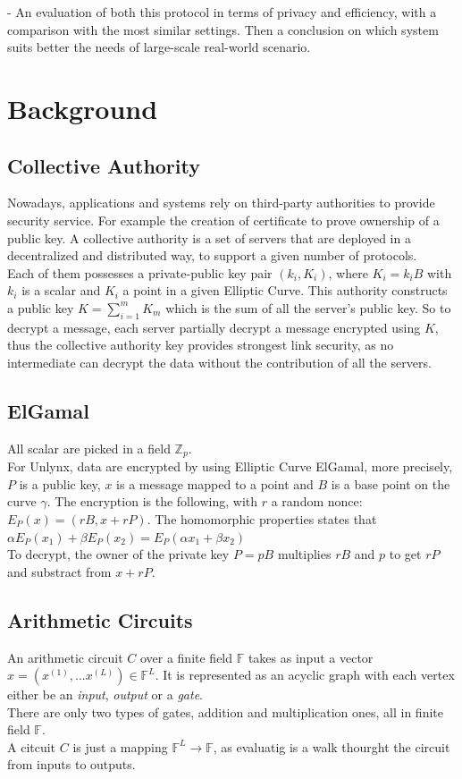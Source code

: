 \documentclass{article}
\begin{document}
- An evaluation of both this protocol in terms of privacy and efficiency, with a comparison with the most similar settings. Then a conclusion on which system suits better the needs of large-scale real-world scenario.


\section*{Background}
\subsection*{Collective Authority}
Nowadays, applications and systems rely on third-party authorities to provide security service. For example the creation of certificate to prove ownership of a public key. A collective authority is a set of servers that are deployed in a decentralized and distributed way, to support a given number of protocols.\\
Each of them possesses a private-public key pair $(k_i,K_i)$, where $K_i = k_i B$ with $k_i$ is a scalar and $K_i$ a point in a given Elliptic Curve. This authority constructs a public key $K = \sum_{i=1}^{m}{K_m}$ which is the sum of all the server's public key. So to decrypt a message, each server partially decrypt a message encrypted using $K$, thus the collective authority key provides strongest link security, as no intermediate can decrypt the data without the contribution of all the servers.

\subsection*{ElGamal}
All scalar are picked in a field $\mathbb{Z}_p$.\\
For Unlynx, data are encrypted by using Elliptic Curve ElGamal, more precisely, $P$ is a public key, $x$ is a message mapped to a point and $B$ is a base point on the curve $\gamma$. The encryption is the following, with $r$ a random nonce:\\
$E_P(x) = (rB,x+rP)$. The homomorphic properties states that $\alpha E_P(x_1) + \beta E_P(x_2) = E_P(\alpha x_1+ \beta x_2)$\\
To decrypt, the owner of the private key $P = pB$ multiplies $rB$ and $p$ to get $rP$ and substract from $x + rP$.\\

\subsection*{Arithmetic Circuits}
An arithmetic circuit $C$ over a finite field $\mathbb{F}$ takes as input a vector $x = (x^{(1)},...x^{(L)}) \in \mathbb{F}^L $. It is represented as an acyclic graph with each vertex either be an \textit{input}, \textit{output} or a \textit{gate}.\\
There are only two types of gates, addition and multiplication ones, all in finite field $\mathbb{F}$.\\
A citcuit $C$ is just a mapping $\mathbb{F}^L \rightarrow \mathbb{F}$, as evaluatig is a walk thourght the circuit from inputs to outputs.
\end{document}
